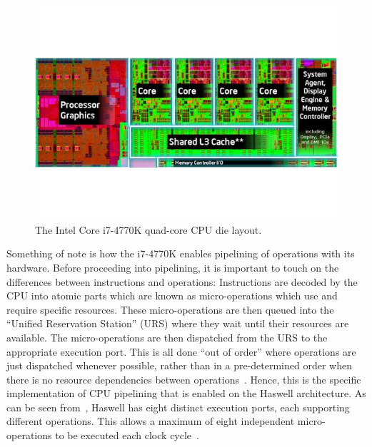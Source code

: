 \documentclass[a4paper,11pt]{article}
\begin{document}
\begin{figure}[ht]
  \centering
  \includegraphics[scale=0.5]{img/haswell-layout}
  \caption{The Intel Core i7-4770K quad-core CPU die layout.~\cite{web:TomHWCorei7DiePic}}
\label{fig:haswell-layout}
\end{figure}

Something of note is how the i7-4770K enables pipelining of operations with its hardware. Before proceeding into pipelining, it is important to touch on the differences between instructions and operations: Instructions are decoded by the CPU into atomic parts which are known as micro-operations which use and require specific resources. These micro-operations are then queued into the ``Unified Reservation Station'' (URS) where they wait until their resources are available. The micro-operations are then dispatched from the URS to the appropriate execution port. This is all done ``out of order'' where operations are just dispatched whenever possible, rather than in a pre-determined order when there is no resource dependencies between operations~\cite{book:Corei7PerfAnalysis}. Hence, this is the specific implementation of CPU pipelining that is enabled on the Haswell architecture. As can be seen from~, Haswell has eight distinct execution ports, each supporting different operations. This allows a maximum of eight independent micro-operations to be executed each clock cycle~\cite{web:TomsHWCorei7}.
\end{document}

